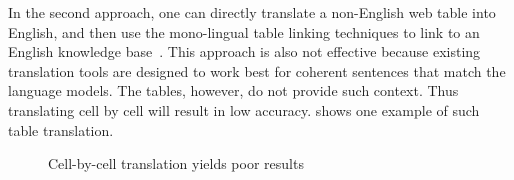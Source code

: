 In the second approach, one can directly translate a non-English web table into English,
and then use the mono-lingual table linking techniques to link to an English knowledge base~\cite{mcnamee2011cross}.
This approach is also not effective because existing translation tools are designed to
work best for coherent sentences that match the language models. The tables, however,
do not provide such context. Thus translating cell by cell will result in low accuracy.
 shows one example of such table translation.

\begin{figure}[th]

\caption{Cell-by-cell translation yields poor results}
\label{fig:cellbycell}
\end{figure}




